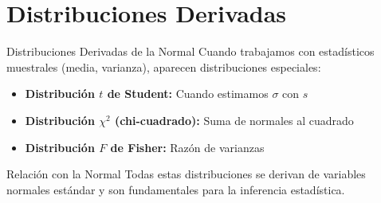 \documentclass[aspectratio=169,11pt]{beamer}
\begin{document}
\section{Distribuciones Derivadas}

\begin{frame}{Distribuciones Derivadas de la Normal}
Cuando trabajamos con estadísticos muestrales (media, varianza), aparecen distribuciones especiales:

\pause
\vspace{0.3cm}
\begin{itemize}
  \item \textbf{Distribución $t$ de Student:} Cuando estimamos $\sigma$ con $s$
  \pause
  \item \textbf{Distribución $\chi^2$ (chi-cuadrado):} Suma de normales al cuadrado
  \pause
  \item \textbf{Distribución $F$ de Fisher:} Razón de varianzas
\end{itemize}

\pause
\vspace{0.3cm}
\begin{block}{Relación con la Normal}
Todas estas distribuciones se derivan de variables normales estándar y son fundamentales para la inferencia estadística.
\end{block}
\end{frame}
\end{document}
